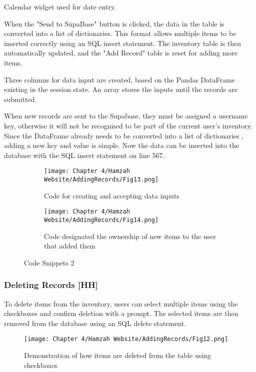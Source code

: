 Calendar widget used for date entry.

When the "Send to SupaBase" button is clicked, the data in the table is converted into a list of dictionaries.
This format allows multiple items to be inserted correctly using an SQL insert statement.
The inventory table is then automatically updated, and the "Add Record" table is reset for adding more items.

Three columns for data input are created, based on the Pandas DataFrame existing in the session state.
An array stores the inputs until the records are submitted.

When new records are sent to the Supabase, they must be assigned a username key, otherwise it will not be recognised to be part of the current user's inventory.
Since the DataFrame already needs to be converted into a list of dictionaries , adding a new key and value is simple.
Now the data can be inserted into the database with the SQL insert statement on line 567.

\begin{figure}[H]
    \begin{subfigure}{.5\textwidth}
        \centering
        \texttt{[image: Chapter 4/Hamzah Website/AddingRecords/Fig13.png]}
        \caption{Code for creating and accepting data inputs}
    \end{subfigure}%
    \begin{subfigure}{.5\textwidth}
        \centering
        \texttt{[image: Chapter 4/Hamzah Website/AddingRecords/Fig14.png]}
        \caption{Code designated the ownership of new items to the user that added them}
    \end{subfigure}
    \caption{Code Snippets 2}
\end{figure}


\subsubsection{Deleting Records [HH]}

To delete items from the inventory, users can select multiple items using the checkboxes and confirm deletion with a prompt.
The selected items are then removed from the database using an SQL delete statement.



\begin{figure}[H]        
    \centering
    \texttt{[image: Chapter 4/Hamzah Website/AddingRecords/Fig12.png]}
    \caption{Demonstration of how items are deleted from the table using checkboxes}
\end{figure} 

